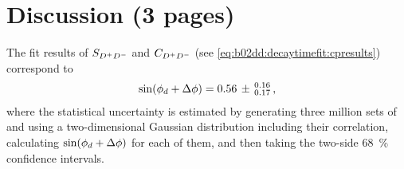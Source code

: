 
\chapter{Discussion (3 pages)}
\label{sec:discussion}

The fit results of $S_{{{D}^+}{{D}^-}}$ and $C_{{{D}^+}{{D}^-}}$ (see \cref{eq:b02dd:decaytimefit:cpresults}) correspond to
\begin{align*}
  \sin({\phi_{{d}}} + \Delta \phi) = 0.56\,\pm\,^{0.16}_{0.17}\,,
\end{align*}
where the statistical uncertainty is estimated by generating three million
sets of \SDD and \CDD using a two-dimensional Gaussian distribution including
their correlation, calculating $\sin({\phi_{{d}}} + \Delta \phi)$ for each of them, and
then taking the two-side \SI{68}{\percent} confidence intervals.



